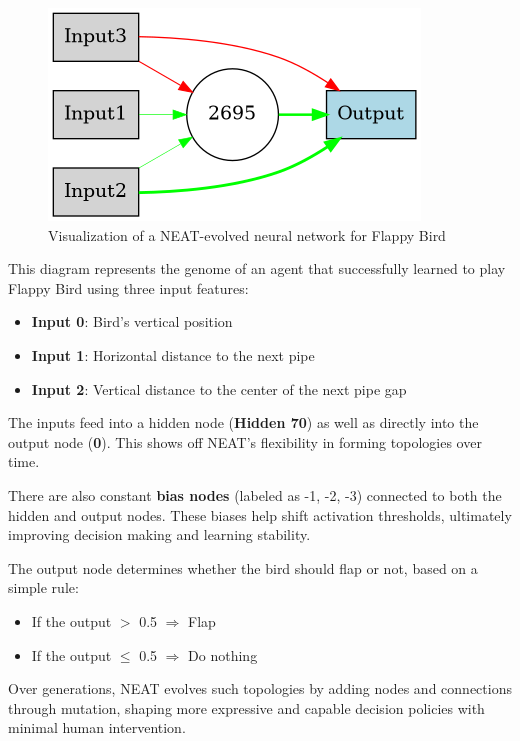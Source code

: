 \documentclass[sigconf]{acmart}
\begin{document}
\begin{figure}[H]
  \centering
  \includegraphics[width=0.85\linewidth]{best_network.png}
  \caption{Visualization of a NEAT-evolved neural network for Flappy Bird}
  \label{fig:neat-neat}
\end{figure}

This diagram represents the genome of an agent that successfully learned to play Flappy Bird using three input features:
\begin{itemize}
  \item \textbf{Input 0}: Bird's vertical position
  \item \textbf{Input 1}: Horizontal distance to the next pipe
  \item \textbf{Input 2}: Vertical distance to the center of the next pipe gap
\end{itemize}

The inputs feed into a hidden node (\textbf{Hidden 70}) as well as directly into the output node (\textbf{0}). This shows off NEAT's flexibility in forming topologies over time.

There are also constant \textbf{bias nodes} (labeled as -1, -2, -3) connected to both the hidden and output nodes. These biases help shift activation thresholds, ultimately
improving decision making and learning stability.

The output node determines whether the bird should flap or not, based on a simple rule:
\begin{itemize}
  \item If the output $>$ 0.5 $\Rightarrow$ Flap
  \item If the output $\leq$ 0.5 $\Rightarrow$ Do nothing
\end{itemize}

Over generations, NEAT evolves such topologies by adding nodes and connections through mutation, shaping more expressive and capable decision policies with minimal human intervention.
\end{document}
